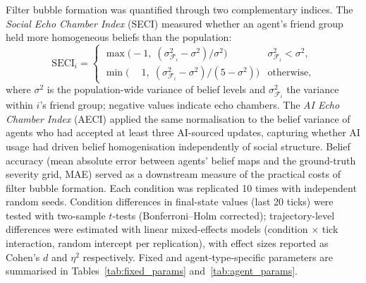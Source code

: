 \documentclass[pdflatex,sn-apa]{sn-jnl}%
\begin{document}
Filter bubble formation was quantified through two complementary
indices.
The \emph{Social Echo Chamber Index} (SECI) measured whether an
agent's friend group held more homogeneous beliefs than the
population:
%
\begin{equation}
  \mathrm{SECI}_i =
  \begin{cases}
    \max\!\bigl(-1,\;(\sigma^2_{\mathcal{F}_i}-\sigma^2)/\sigma^2\bigr)
      & \sigma^2_{\mathcal{F}_i} < \sigma^2,\\[4pt]
    \min\!\bigl(\phantom{-}1,\;(\sigma^2_{\mathcal{F}_i}-\sigma^2)/(5-\sigma^2)\bigr)
      & \text{otherwise,}
  \end{cases}
  \label{eq:seci}
\end{equation}
%
where $\sigma^2$ is the population-wide variance of belief levels
and $\sigma^2_{\mathcal{F}_i}$ the variance within $i$'s friend group;
negative values indicate echo chambers.
The \emph{AI Echo Chamber Index} (AECI) applied the same
normalisation to the belief variance of agents who had accepted at
least three AI-sourced updates, capturing whether AI usage had
driven belief homogenisation independently of social structure.
Belief accuracy (mean absolute error between agents' belief maps
and the ground-truth severity grid, MAE) served as a downstream
measure of the practical costs of filter bubble formation.
Each condition was replicated 10 times with independent random
seeds.
Condition differences in final-state values (last 20 ticks) were
tested with two-sample $t$-tests (Bonferroni--Holm corrected);
trajectory-level differences were estimated with linear
mixed-effects models (condition $\times$ tick interaction, random
intercept per replication), with effect sizes reported as Cohen's
$d$ and $\eta^2$ respectively.
Fixed and agent-type-specific parameters are summarised in
Tables~\ref{tab:fixed_params} and~\ref{tab:agent_params}.

\end{document}
